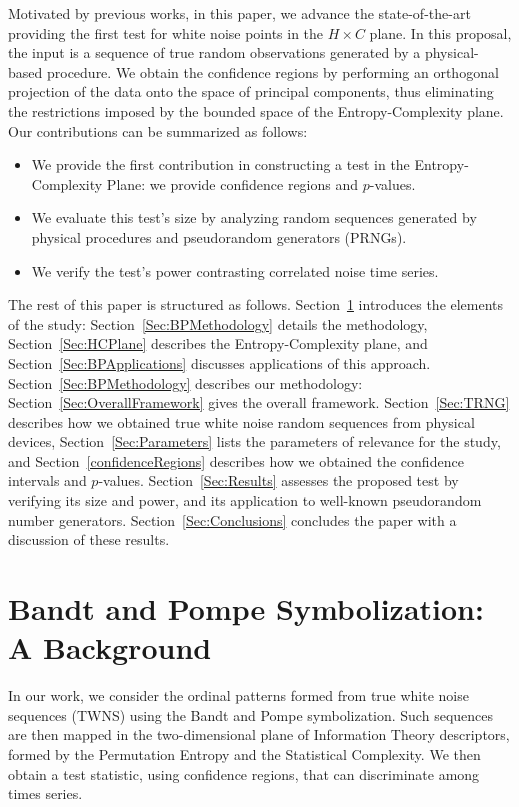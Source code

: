 \documentclass[alpha-refs]{wiley-article}
\begin{document}
Motivated by previous works, in this paper, we advance the state-of-the-art providing the first test for white noise points in the $H\times C$ plane.
In this proposal, the input is a sequence of true random observations generated by a physical-based procedure. 
We obtain the confidence regions by performing an orthogonal projection of the data onto the space of principal components, thus eliminating the restrictions imposed by the bounded space of the Entropy-Complexity plane.
Our contributions can be summarized as follows:
\begin{itemize}
	\item We provide the first contribution in constructing a test in the Entropy-Complexity Plane: we provide confidence regions and $p$-values.
	\item We evaluate this test's size by analyzing random sequences generated by physical procedures and pseudorandom generators (PRNGs).
	\item We verify the test's power contrasting correlated noise time series.
\end{itemize}

The rest of this paper is structured as follows. 
Section~\ref{Sec:BP} introduces the elements of the study:
Section~\ref{Sec:BPMethodology} details the methodology,
Section~\ref{Sec:HCPlane} describes the Entropy-Complexity plane,
and Section~\ref{Sec:BPApplications} discusses applications of this approach.
%
Section~\ref{Sec:BPMethodology} describes our methodology:
Section~\ref{Sec:OverallFramework} gives the overall framework.
Section~\ref{Sec:TRNG} describes how we obtained true white noise random sequences from physical devices,
Section~\ref{Sec:Parameters} lists the parameters of relevance for the study, and
Section~\ref{confidenceRegions} describes how we obtained the confidence intervals and $p$-values.
%
Section~\ref{Sec:Results} assesses the proposed test by verifying its size and power, and its application to well-known pseudorandom number generators.
Section~\ref{Sec:Conclusions} concludes the paper with a discussion of these results.

\section{Bandt and Pompe Symbolization: A Background}\label{Sec:BP}

In our work, we consider the ordinal patterns formed from true white noise sequences (TWNS) using the Bandt and Pompe symbolization.
Such sequences are then mapped in the two-dimensional plane of Information Theory descriptors, formed by the Permutation Entropy and the Statistical Complexity.
We then obtain a test statistic, using confidence regions, that can discriminate among times series.
\end{document}
